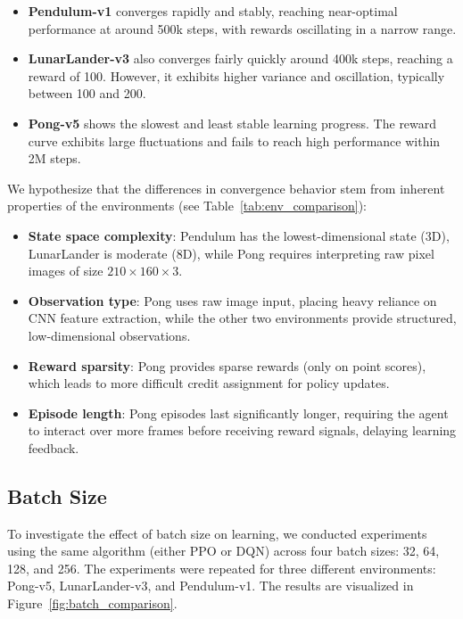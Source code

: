 \documentclass[10pt,twocolumn,letterpaper]{article}
\begin{document}
\begin{itemize}
  \item \textbf{Pendulum-v1} converges rapidly and stably, reaching near-optimal performance at around 500k steps, with rewards oscillating in a narrow range.
  \item \textbf{LunarLander-v3} also converges fairly quickly around 400k steps, reaching a reward of 100. However, it exhibits higher variance and oscillation, typically between 100 and 200.
  \item \textbf{Pong-v5} shows the slowest and least stable learning progress. The reward curve exhibits large fluctuations and fails to reach high performance within 2M steps.
\end{itemize}

We hypothesize that the differences in convergence behavior stem from inherent properties of the environments (see Table~\ref{tab:env_comparison}):

\begin{itemize}
  \item \textbf{State space complexity}: Pendulum has the lowest-dimensional state (3D), LunarLander is moderate (8D), while Pong requires interpreting raw pixel images of size $210 \times 160 \times 3$.
  \item \textbf{Observation type}: Pong uses raw image input, placing heavy reliance on CNN feature extraction, while the other two environments provide structured, low-dimensional observations.
  \item \textbf{Reward sparsity}: Pong provides sparse rewards (only on point scores), which leads to more difficult credit assignment for policy updates.
  \item \textbf{Episode length}: Pong episodes last significantly longer, requiring the agent to interact over more frames before receiving reward signals, delaying learning feedback.
\end{itemize}

\subsection{Batch Size}
To investigate the effect of batch size on learning, we conducted experiments using the same algorithm (either PPO or DQN) across four batch sizes: 32, 64, 128, and 256. The experiments were repeated for three different environments: Pong-v5, LunarLander-v3, and Pendulum-v1. The results are visualized in Figure~\ref{fig:batch_comparison}.
\end{document}
